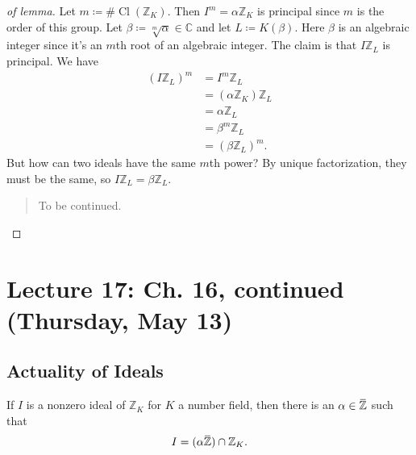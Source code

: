 \begin{proof}[of lemma]

Let \(m \coloneqq\# { \operatorname{Cl}} ({\mathbb{Z}}_K)\). Then
\(I^m = \alpha{\mathbb{Z}}_K\) is principal since \(m\) is the order of
this group. Let \(\beta\coloneqq\sqrt[m]{\alpha} \in {\mathbb{C}}\) and
let \(L \coloneqq K( \beta)\). Here \(\beta\) is an algebraic integer
since it's an \(m\)th root of an algebraic integer. The claim is that
\(I{\mathbb{Z}}_L\) is principal. We have
\begin{align*}
(I {\mathbb{Z}}_L)^m
&= I^m {\mathbb{Z}}_L \\
&= ( \alpha{\mathbb{Z}}_K) {\mathbb{Z}}_L \\
&= \alpha{\mathbb{Z}}_L \\
&= \beta^m {\mathbb{Z}}_L \\
&= (\beta {\mathbb{Z}}_L)^m
.\end{align*}
But how can two ideals have the same \(m\)th power? By unique
factorization, they must be the same, so
\(I{\mathbb{Z}}_L = \beta {\mathbb{Z}}_L\).

\begin{quote}
To be continued.
\end{quote}

\end{proof}

\hypertarget{lecture-17-ch.-16-continued-thursday-may-13}{%
\section{Lecture 17: Ch. 16, continued (Thursday, May
13)}\label{lecture-17-ch.-16-continued-thursday-may-13}}

\hypertarget{actuality-of-ideals}{%
\subsection{Actuality of Ideals}\label{actuality-of-ideals}}

\begin{theorem}

If \(I\) is a nonzero ideal of \({\mathbb{Z}}_K\) for \(K\) a number
field, then there is an
\(\alpha\in \mkern 1.5mu\overline{\mkern-1.5mu{\mathbb{Z}}\mkern-1.5mu}\mkern 1.5mu\)
such that
\begin{align*}
I = (\alpha \mkern 1.5mu\overline{\mkern-1.5mu{\mathbb{Z}}\mkern-1.5mu}\mkern 1.5mu) \cap{\mathbb{Z}}_K
.\end{align*}

\end{theorem}

